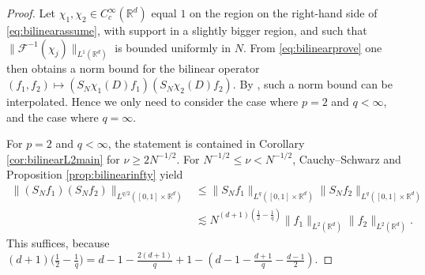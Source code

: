 \documentclass{amsart}
\numberwithin{equation}{section}
\theoremstyle{definition}
\newcommand{\R}{\mathbb{R}}
\newcommand{\Rd}{\mathbb{R}^{d}}
\newcommand{\F}{\mathcal{F}}
\newcommand {\HT}{\mathcal{H}}
\begin{document}
\begin{proof}
Let $\chi_{1},\chi_{2}\in C^{\infty}_{c}(\Rd)$ equal $1$ on the region on the right-hand side of \eqref{eq:bilinearassume}, with support in a slightly bigger region, and such that $\|\F^{-1}(\chi_{j})\|_{L^{1}(\Rd)}$ is bounded uniformly in $N$. From \eqref{eq:bilinearprove} 
one then obtains a norm bound for the bilinear operator $(f_{1},f_{2})\mapsto (S_{N}\chi_{1}(D)f_{1})(S_{N}\chi_{2}(D)f_{2})$. %
By \cite[Theorem 4.4.1]{Bergh-Lofstrom76}, such a norm bound can be interpolated. Hence we only need to consider the case where $p=2$ and $q<\infty$, and the case where $q=\infty$. %

For $p=2$ and $q<\infty$, the statement is contained in Corollary \ref{cor:bilinearL2main} for  $\nu\geq 2N^{-1/2}$. 
For $N^{-1/2}\leq \nu<N^{-1/2}$, Cauchy--Schwarz and Proposition \ref{prop:bilinearinfty} yield
\begin{align*}
\|(S_{N}f_{1})(S_{N}f_{2})\|_{L^{q/2}([0,1] \times \R^d)}&\leq \|S_{N}f_{1}\|_{L^{q}([0,1] \times \R^d)}\|S_{N}f_{2}\|_{L^{q}([0,1] \times \R^d)}\\
&\lesssim N^{(d+1)(\frac{1}{2}-\frac{1}{q})}\| f_{1} \|_{L^{2}(\Rd)}\| f_{2} \|_{L^{2}(\Rd)}.
\end{align*}
This suffices, because $(d+1) \big( \frac{1}{2} - \frac{1}{q} \big) = d-1-\frac{2(d+1)}{q}+1-(d-1-\frac{d+1}{q}-\frac{d-1}{2})$.


\end{proof}
\end{document}
